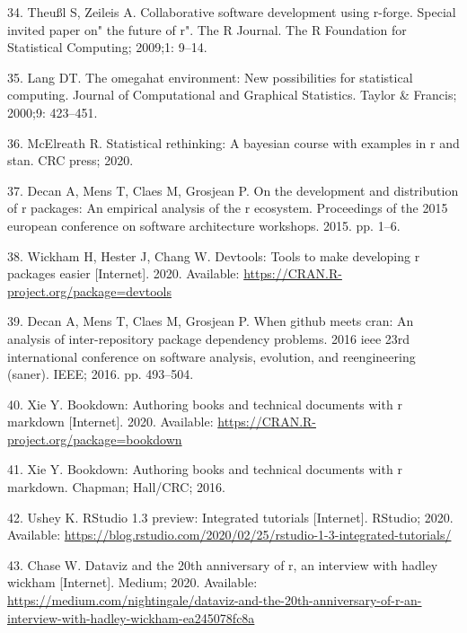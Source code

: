 \documentclass[10pt,letterpaper]{article}
\begin{document}
\leavevmode\hypertarget{ref-theussl2009}{}%
34. Theußl S, Zeileis A. Collaborative software development using
r-forge. Special invited paper on" the future of r". The R Journal. The
R Foundation for Statistical Computing; 2009;1: 9--14.

\leavevmode\hypertarget{ref-lang2000}{}%
35. Lang DT. The omegahat environment: New possibilities for statistical
computing. Journal of Computational and Graphical Statistics. Taylor \&
Francis; 2000;9: 423--451.

\leavevmode\hypertarget{ref-mcelreath2020}{}%
36. McElreath R. Statistical rethinking: A bayesian course with examples
in r and stan. CRC press; 2020.

\leavevmode\hypertarget{ref-decan2015}{}%
37. Decan A, Mens T, Claes M, Grosjean P. On the development and
distribution of r packages: An empirical analysis of the r ecosystem.
Proceedings of the 2015 european conference on software architecture
workshops. 2015. pp. 1--6.

\leavevmode\hypertarget{ref-devtools}{}%
38. Wickham H, Hester J, Chang W. Devtools: Tools to make developing r
packages easier {[}Internet{]}. 2020. Available:
\url{https://CRAN.R-project.org/package=devtools}

\leavevmode\hypertarget{ref-decan2016}{}%
39. Decan A, Mens T, Claes M, Grosjean P. When github meets cran: An
analysis of inter-repository package dependency problems. 2016 ieee 23rd
international conference on software analysis, evolution, and
reengineering (saner). IEEE; 2016. pp. 493--504.

\leavevmode\hypertarget{ref-bookdown}{}%
40. Xie Y. Bookdown: Authoring books and technical documents with r
markdown {[}Internet{]}. 2020. Available:
\url{https://CRAN.R-project.org/package=bookdown}

\leavevmode\hypertarget{ref-xie2016}{}%
41. Xie Y. Bookdown: Authoring books and technical documents with r
markdown. Chapman; Hall/CRC; 2016.

\leavevmode\hypertarget{ref-ushey2020}{}%
42. Ushey K. RStudio 1.3 preview: Integrated tutorials {[}Internet{]}.
RStudio; 2020. Available:
\url{https://blog.rstudio.com/2020/02/25/rstudio-1-3-integrated-tutorials/}

\leavevmode\hypertarget{ref-chase2020}{}%
43. Chase W. Dataviz and the 20th anniversary of r, an interview with
hadley wickham {[}Internet{]}. Medium; 2020. Available:
\url{https://medium.com/nightingale/dataviz-and-the-20th-anniversary-of-r-an-interview-with-hadley-wickham-ea245078fc8a}
\end{document}
